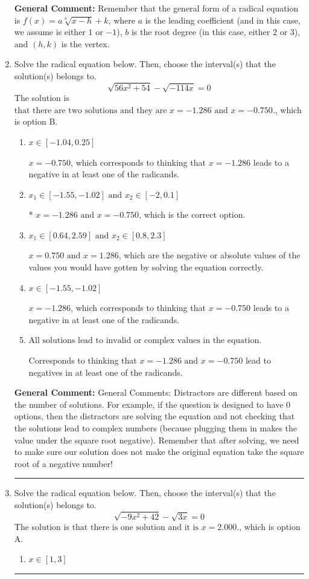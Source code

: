 \documentclass{extbook}[14pt]
\newcommand{\litem}[1]{\item #1

\rule{\textwidth}{0.4pt}}
\begin{document}
\begin{enumerate}
{\textbf{General Comment:} Remember that the general form of a radical equation is $ f(x) = a \sqrt[b]{x - h} + k$, where $a$ is the leading coefficient (and in this case, we assume is either $1$ or $-1$), $b$ is the root degree (in this case, either $2$ or $3$), and $(h, k)$ is the vertex.
}
\litem{
Solve the radical equation below. Then, choose the interval(s) that the solution(s) belongs to.
\[ \sqrt{56 x^2 + 54} - \sqrt{-114 x} = 0 \]
The solution is \( \text{that there are two solutions and they are } x = -1.286 \text{ and } x = -0.750. \), which is option B.\begin{enumerate}[label=\Alph*.]
\item \( x \in [-1.04,0.25] \)

$x = -0.750$, which corresponds to thinking that $x = -1.286$ leads to a negative in at least one of the radicands.
\item \( x_1 \in [-1.55, -1.02] \text{ and } x_2 \in [-2,0.1] \)

* $x = -1.286 \text{ and } x = -0.750$, which is the correct option.
\item \( x_1 \in [0.64, 2.59] \text{ and } x_2 \in [0.8,2.3] \)

$x = 0.750 \text{ and } x = 1.286$, which are the negative or absolute values of the values you would have gotten by solving the equation correctly.
\item \( x \in [-1.55,-1.02] \)

$x = -1.286$, which corresponds to thinking that $x = -0.750$ leads to a negative in at least one of the radicands.
\item \( \text{All solutions lead to invalid or complex values in the equation.} \)

Corresponds to thinking that $x = -1.286 \text{ and } x = -0.750$ lead to negatives in at least one of the radicands.
\end{enumerate}

\textbf{General Comment:} General Comments: Distractors are different based on the number of solutions. For example, if the question is designed to have 0 options, then the distractors are solving the equation and not checking that the solutions lead to complex numbers (because plugging them in makes the value under the square root negative). Remember that after solving, we need to make sure our solution does not make the original equation take the square root of a negative number!
}
\litem{
Solve the radical equation below. Then, choose the interval(s) that the solution(s) belongs to.
\[ \sqrt{-9 x^2 + 42} - \sqrt{3 x} = 0 \]
The solution is \( \text{that there is one solution and it is } x = 2.000. \), which is option A.\begin{enumerate}[label=\Alph*.]
\item \( x \in [1,3] \)


\end{enumerate}}
\end{enumerate}
\end{document}
